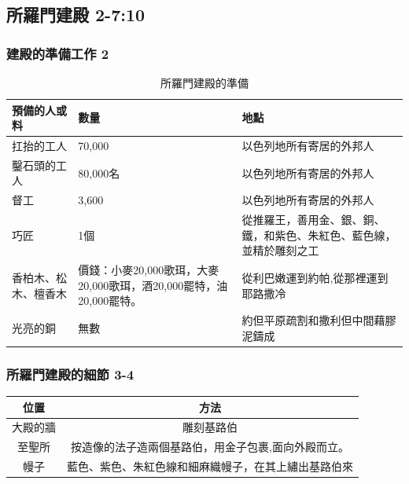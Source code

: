 \subsection{所羅門建殿 2-7:10 }
\subsubsection{建殿的準備工作 2 }

\begin{table}[H]
\centering
\begin{tabular}{p{3cm}|p{5cm}|p{5cm}}
\hline
\hline
預備的人或料 &數量 &地點　\\\hline\hline
扛抬的工人    &70,000    &以色列地所有寄居的外邦人 \\\hline
鑿石頭的工人  & 80,000名 &以色列地所有寄居的外邦人 \\\hline
督工          & 3,600    & 以色列地所有寄居的外邦人  \\\hline
巧匠          & 1個      &從推羅王，善用金、銀、銅、鐵，和紫色、朱紅色、藍色線，並精於雕刻之工 \\\hline
香柏木、松木、檀香木&價錢：小麥20,000歌珥，大麥20,000歌珥，酒20,000罷特，油20,000罷特。  &從利巴嫩運到約帕,從那裡運到耶路撒冷\\\hline
光亮的銅 &無數 & 約但平原疏割和撒利但中間藉膠泥鑄成\\\hline
\end{tabular}
\caption{所羅門建殿的準備}
\end{table}




\subsubsection{所羅門建殿的細節 3-4 }


\begin{table}[H]
\centering
\begin{tabular}{c|c}\hline\hline
位置      &方法    \\\hline\hline
 大殿的牆    & 雕刻基路伯     \\\hline
至聖所   & 按造像的法子造兩個基路伯，用金子包裹,面向外殿而立。   \\\hline
幔子    & 藍色、紫色、朱紅色線和細麻織幔子，在其上繡出基路伯來\\\hline
\end{tabular}
\end{table}

